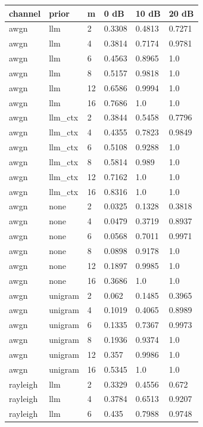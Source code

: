 \begin{tabular}{llllll}
\hline
channel & prior & m & 0 dB & 10 dB & 20 dB \\
\hline
awgn & llm & 2 & 0.3308 & 0.4813 & 0.7271 \\
awgn & llm & 4 & 0.3814 & 0.7174 & 0.9781 \\
awgn & llm & 6 & 0.4563 & 0.8965 & 1.0 \\
awgn & llm & 8 & 0.5157 & 0.9818 & 1.0 \\
awgn & llm & 12 & 0.6586 & 0.9994 & 1.0 \\
awgn & llm & 16 & 0.7686 & 1.0 & 1.0 \\
awgn & llm\_ctx & 2 & 0.3844 & 0.5458 & 0.7796 \\
awgn & llm\_ctx & 4 & 0.4355 & 0.7823 & 0.9849 \\
awgn & llm\_ctx & 6 & 0.5108 & 0.9288 & 1.0 \\
awgn & llm\_ctx & 8 & 0.5814 & 0.989 & 1.0 \\
awgn & llm\_ctx & 12 & 0.7162 & 1.0 & 1.0 \\
awgn & llm\_ctx & 16 & 0.8316 & 1.0 & 1.0 \\
awgn & none & 2 & 0.0325 & 0.1328 & 0.3818 \\
awgn & none & 4 & 0.0479 & 0.3719 & 0.8937 \\
awgn & none & 6 & 0.0568 & 0.7011 & 0.9971 \\
awgn & none & 8 & 0.0898 & 0.9178 & 1.0 \\
awgn & none & 12 & 0.1897 & 0.9985 & 1.0 \\
awgn & none & 16 & 0.3686 & 1.0 & 1.0 \\
awgn & unigram & 2 & 0.062 & 0.1485 & 0.3965 \\
awgn & unigram & 4 & 0.1019 & 0.4065 & 0.8989 \\
awgn & unigram & 6 & 0.1335 & 0.7367 & 0.9973 \\
awgn & unigram & 8 & 0.1936 & 0.9374 & 1.0 \\
awgn & unigram & 12 & 0.357 & 0.9986 & 1.0 \\
awgn & unigram & 16 & 0.5345 & 1.0 & 1.0 \\
rayleigh & llm & 2 & 0.3329 & 0.4556 & 0.672 \\
rayleigh & llm & 4 & 0.3784 & 0.6513 & 0.9207 \\
rayleigh & llm & 6 & 0.435 & 0.7988 & 0.9748 \\

\end{tabular}
